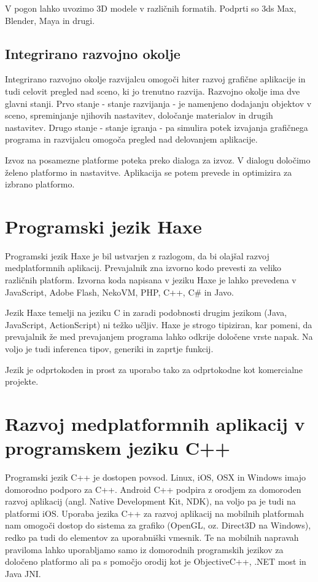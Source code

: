 V pogon lahko uvozimo 3D modele v različnih formatih. Podprti so 3ds Max, Blender, Maya in drugi. 

\subsection{Integrirano razvojno okolje} 

Integrirano razvojno okolje razvijalcu omogoči hiter razvoj grafične aplikacije in tudi celovit pregled nad sceno, ki jo trenutno razvija. Razvojno okolje ima dve glavni stanji. Prvo stanje - stanje razvijanja - je namenjeno dodajanju objektov v sceno, spreminjanje njihovih nastavitev, določanje materialov in drugih nastavitev. Drugo stanje - stanje igranja - pa simulira potek izvajanja grafičnega programa in razvijalcu omogoča pregled nad delovanjem aplikacije. 

Izvoz na posamezne platforme poteka preko dialoga za izvoz. V dialogu določimo želeno platformo in nastavitve. Aplikacija se potem prevede in optimizira za izbrano platformo.


\section{Programski jezik Haxe}
\label{sec:haxe}

Programski jezik Haxe \cite{haxe} je bil ustvarjen z razlogom, da bi olajšal razvoj medplatformnih aplikacij. Prevajalnik zna izvorno kodo prevesti za veliko različnih platform. Izvorna koda napisana v jeziku Haxe je lahko prevedena v JavaScript, Adobe Flash, NekoVM, PHP, C++, C\# in Javo.

Jezik Haxe temelji na jeziku C in zaradi podobnosti drugim jezikom (Java, JavaScript, ActionScript) ni težko učljiv. Haxe je strogo tipiziran, kar pomeni, da prevajalnik že med prevajanjem programa lahko odkrije določene vrste napak. Na voljo je tudi inferenca tipov, generiki in zaprtje funkcij. 

Jezik je odprtokoden in prost za uporabo tako za odprtokodne kot komercialne projekte.

\section{Razvoj medplatformnih aplikacij v programskem jeziku C++}
\label{sec:cpp}
Programski jezik C++ je dostopen povsod. Linux, iOS, OSX in Windows imajo domorodno podporo za C++. Android C++ podpira z orodjem za domoroden razvoj aplikacij (angl. Native Development Kit, NDK), na voljo pa je tudi na platformi iOS. Uporaba jezika C++ za razvoj aplikacij na mobilnih platformah nam omogoči dostop do sistema za grafiko (OpenGL, oz. Direct3D na Windows), redko pa tudi do elementov za uporabniški vmesnik. Te na mobilnih napravah praviloma lahko uporabljamo samo iz domorodnih programskih jezikov za določeno platformo ali pa s pomočjo orodij kot je ObjectiveC++, .NET most in Java JNI.

